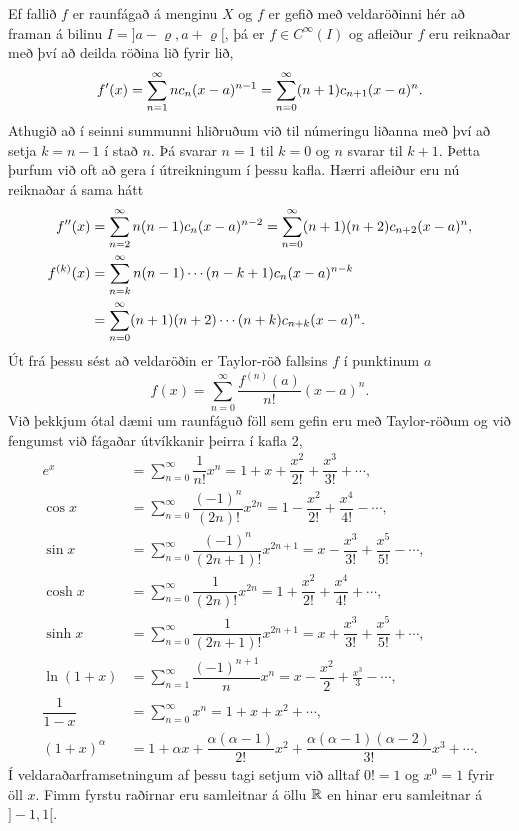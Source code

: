 Ef fallið $f$ er raunfágað á menginu $X$ og $f$ er gefið með
veldaröðinni
hér að framan  á bilinu $I=]a-{\varrho},a+{\varrho}[$, þá er $f\in
C^{\infty}(I)$ og afleiður $f$ eru reiknaðar með því að deilda röðina
lið fyrir lið,
$$f{\sp{\prime}}(x)= \sum\limits_{n=1}^\infty nc_n(x-a)^{n-1}
= \sum\limits_{n=0}^\infty (n+1)c_{n+1}(x-a)^n.
$$
Athugið að í seinni summunni hliðruðum við til númeringu liðanna
með því að setja $k=n-1$ í stað $n$.  Þá svarar $n=1$ til $k=0$
og $n$ svarar til $k+1$.  Þetta þurfum við oft að gera í útreikningum
í þessu kafla.  Hærri afleiður eru nú reiknaðar á sama hátt
\begin{align*}
f{\sp{\prime\prime}}(x)&= \sum\limits_{n=2}^\infty n(n-1)c_n(x-a)^{n-2}
= \sum\limits_{n=0}^\infty (n+1)(n+2)c_{n+2}(x-a)^n,\\
f^{(k)}(x)&= \sum\limits_{n=k}^\infty n(n-1)\cdots (n-k+1)c_n(x-a)^{n-k}\\
&= \sum\limits_{n=0}^\infty (n+1)(n+2)\cdots(n+k)c_{n+k}(x-a)^n.
\end{align*}
Út frá þessu sést að veldaröðin  er
Taylor-röð fallsins $f$ í
punktinum $a$
\begin{equation*}
f(x)=\sum\limits_{n=0}^\infty \dfrac{f^{(n)}(a)}{n!}(x-a)^{n}.
\label{3.1.3}
\end{equation*}
Við þekkjum ótal dæmi um raunfáguð föll sem gefin eru með
Taylor-röðum og við fengumst við fágaðar útvíkkanir þeirra í 
kafla 2,
\begin{align*}
e^x&=\sum\limits_{n=0}^\infty\dfrac 1{n!}{x^n}
=1+x+\dfrac {x^2}{2!}+\dfrac{x^3}{3!}+\cdots,\\
\cos x&= \sum\limits_{n=0}^\infty \dfrac{(-1)^n}{(2n)!}x^{2n}
=1-\dfrac{x^2}{2!}+\dfrac{x^4}{4!}-\cdots,\\
\sin x &=\sum\limits_{n=0}^\infty\dfrac{(-1)^n}{(2n+1)!}x^{2n+1}
= x-\dfrac {x^3}{3!}+\dfrac{x^5}{5!}-\cdots,\\
\cosh x&=\sum\limits_{n=0}^\infty\dfrac{1}{(2n)!}x^{2n}
=1+\dfrac{x^2}{2!}+\dfrac{x^4}{4!}+\cdots,\\
\sinh x &=\sum\limits_{n=0}^\infty\dfrac{1}{(2n+1)!}x^{2n+1}
= x+\dfrac {x^3}{3!}+\dfrac{x^5}{5!}+\cdots,\\
\ln (1+x) &= \sum\limits_{n=1}^\infty\dfrac{(-1)^{n+1}}{n}x^n
=x-\dfrac{x^2}{2}+\frac{x^3}3-\cdots,\\
\dfrac 1{1-x}&=\sum\limits_{n=0}^\infty x^n
=1+x+x^2+\cdots, \\
(1+x)^\alpha&= 1+\alpha x+ \dfrac{\alpha(\alpha-1)}{2!}x^2 + 
\dfrac {\alpha(\alpha-1)(\alpha-2)}{3!}x^3+\cdots.
\end{align*}
Í veldaraðarframsetningum af þessu tagi setjum við alltaf $0!=1$
og $x^0=1$ fyrir öll $x$.  Fimm fyrstu raðirnar eru samleitnar á
öllu
${\mathbb R}$ en hinar eru samleitnar á $]-1,1[$.



